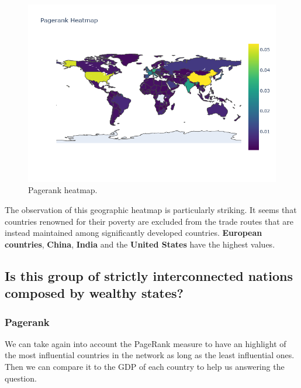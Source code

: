 \documentclass[12pt, a4paper]{article}
\begin{document}
\begin{figure}[ht]
\centering
\includegraphics[width=.6\textwidth]{figures/question2/figure_6.png}
\captionsetup{font=scriptsize,labelfont=bf}
\caption{Pagerank heatmap.}
\label{fig:figure6}
\end{figure}

The observation of this geographic heatmap is particularly striking. It seems that countries renowned for their poverty are excluded from the trade routes that are instead maintained among significantly developed countries. \textbf{European countries}, \textbf{China}, \textbf{India} and the \textbf{United States} have the highest values.

\subsection{Is this group of strictly interconnected nations composed by wealthy states?}
\subsubsection{Pagerank}
We can take again into account the PageRank measure to have an highlight of the most influential countries in the network as long as the least influential ones. Then we can compare it to the GDP of each country to help us answering the question.

\end{document}
